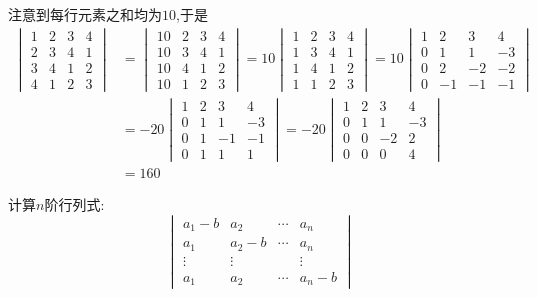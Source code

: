\documentclass{ctexart}
\begin{document}
\begin{solution}
    注意到每行元素之和均为$10$,于是
    \[\begin{aligned}
        \begin{vmatrix}
            1&2&3&4\\
            2&3&4&1\\
            3&4&1&2\\
            4&1&2&3
        \end{vmatrix}
        &= \begin{vmatrix}
                10&2&3&4\\
                10&3&4&1\\
                10&4&1&2\\
                10&1&2&3
            \end{vmatrix} = 
            10\begin{vmatrix}
                1&2&3&4\\
                1&3&4&1\\
                1&4&1&2\\
                1&1&2&3
            \end{vmatrix} =
            10\begin{vmatrix}
                1&2&3&4\\
                0&1&1&-3\\
                0&2&-2&-2\\
                0&-1&-1&-1
            \end{vmatrix} \\
        &= -20\begin{vmatrix}
                1&2&3&4\\
                0&1&1&-3\\
                0&1&-1&-1\\
                0&1&1&1
            \end{vmatrix} =
            -20\begin{vmatrix}
                1&2&3&4\\
                0&1&1&-3\\
                0&0&-2&2\\
                0&0&0&4
            \end{vmatrix}\\
        &= 160
    \end{aligned}\]
\end{solution}
\begin{homework}[2(2)]
    计算$n$阶行列式:
    \[\begin{vmatrix}
        a_1-b&a_2&\cdots&a_n\\
        a_1&a_2-b&\cdots&a_n\\
        \vdots&\vdots& &\vdots\\
        a_1&a_2&\cdots&a_n-b
    \end{vmatrix}\]
\end{homework}
\end{document}
